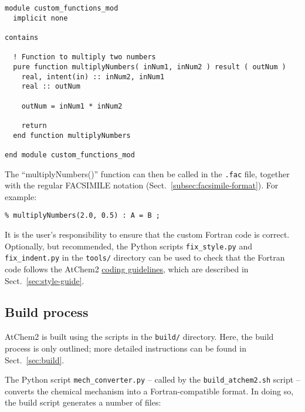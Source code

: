 \begin{verbatim}
module custom_functions_mod
  implicit none

contains

  ! Function to multiply two numbers
  pure function multiplyNumbers( inNum1, inNum2 ) result ( outNum )
    real, intent(in) :: inNum2, inNum1
    real :: outNum

    outNum = inNum1 * inNum2

    return
  end function multiplyNumbers

end module custom_functions_mod
\end{verbatim}

The ``multiplyNumbers()'' function can then be called in the
\texttt{.fac} file, together with the regular FACSIMILE notation
(Sect.~\ref{subsec:facsimile-format}). For example:

\begin{verbatim}
% multiplyNumbers(2.0, 0.5) : A = B ;
\end{verbatim}

It is the user's responsibility to ensure that the custom Fortran code
is correct. Optionally, but recommended, the Python scripts
\texttt{fix\_style.py} and \texttt{fix\_indent.py} in the \texttt{tools/}
directory can be used to check that the Fortran code follows the
AtChem2 \hyperref[subsec:style-recommendations]{coding guidelines},
which are described in Sect.~\ref{sec:style-guide}.

\subsection{Build process} \label{subsec:build-process}

AtChem2 is built using the scripts in the \texttt{build/}
directory. Here, the build process is only outlined; more detailed
instructions can be found in Sect.~\ref{sec:build}.

The Python script \texttt{mech\_converter.py} -- called by the
\texttt{build\_atchem2.sh} script -- converts the chemical mechanism
into a Fortran-compatible format. In doing so, the build script
generates a number of files:


